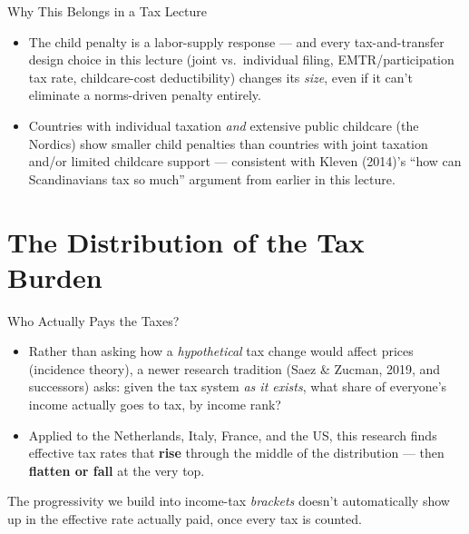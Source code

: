 \documentclass[11pt,aspectratio=169]{beamer}
\begin{document}
\begin{frame}{Why This Belongs in a Tax Lecture}
  \small
  \begin{itemize}
    \item The child penalty is a labor-supply response --- and every tax-and-transfer design choice in this lecture (joint vs.\ individual filing, EMTR/participation tax rate, childcare-cost deductibility) changes its \emph{size}, even if it can't eliminate a norms-driven penalty entirely.
    \item Countries with individual taxation \emph{and} extensive public childcare (the Nordics) show smaller child penalties than countries with joint taxation and/or limited childcare support --- consistent with Kleven (2014)'s ``how can Scandinavians tax so much'' argument from earlier in this lecture.
  \end{itemize}
\end{frame}

\section{The Distribution of the Tax Burden}

\begin{frame}{Who Actually Pays the Taxes?}
  \begin{itemize}
    \item Rather than asking how a \emph{hypothetical} tax change would affect prices (incidence theory), a newer research tradition (Saez \& Zucman, 2019, and successors) asks: given the tax system \emph{as it exists}, what share of everyone's income actually goes to tax, by income rank?
    \item Applied to the Netherlands, Italy, France, and the US, this research finds effective tax rates that \textbf{rise} through the middle of the distribution --- then \textbf{flatten or fall} at the very top.
  \end{itemize}
  \vspace{0.3em}

  The progressivity we build into income-tax \emph{brackets} doesn't automatically show up in the effective rate actually paid, once every tax is counted.
  \
\end{frame}
\end{document}
